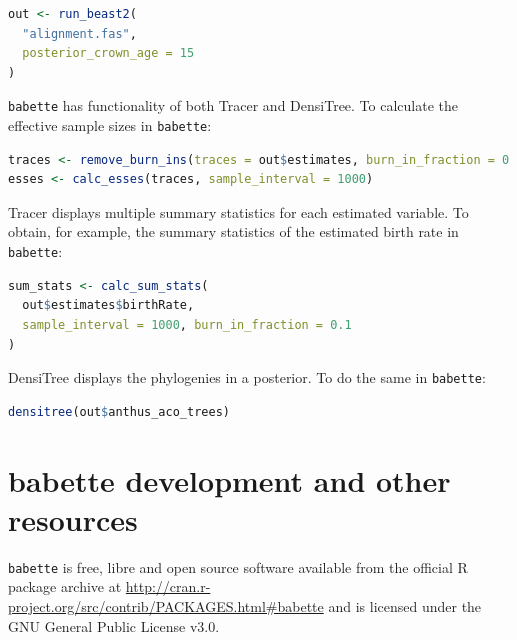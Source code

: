 \documentclass{article}
\begin{document}
\begin{lstlisting}[language=R, caption=Example with fixed crown age, label=lst:fixed_crown_age, floatplacement=H]
out <- run_beast2(
  "alignment.fas",
  posterior_crown_age = 15
)
\end{lstlisting}

\verb;babette; has functionality of both Tracer and
DensiTree. To calculate the effective sample sizes in \verb;babette;:

\begin{lstlisting}[language=R, caption=Calculate ESSes, label=lst:calc_esses, floatplacement=H]
traces <- remove_burn_ins(traces = out$estimates, burn_in_fraction = 0.2)
esses <- calc_esses(traces, sample_interval = 1000)
\end{lstlisting}

Tracer displays multiple summary statistics for each
estimated variable. To obtain, for example, the
summary statistics of the estimated birth rate in \verb;babette;:

\begin{lstlisting}[language=R, caption=Calculate all summary statistics, label=lst:calc_sum_stats, floatplacement=H]
sum_stats <- calc_sum_stats(
  out$estimates$birthRate, 
  sample_interval = 1000, burn_in_fraction = 0.1
)
\end{lstlisting}

DensiTree displays the phylogenies in a posterior.
To do the same in \verb;babette;:

\begin{lstlisting}[language=R, caption=Show posterior phylogenies, label=lst:densitree, floatplacement=H]
densitree(out$anthus_aco_trees)
\end{lstlisting}

\section{babette development and other resources}

\verb;babette; is free, libre and open source software available from the official R package archive at 
\url{http://cran.r-project.org/src/contrib/PACKAGES.html\#babette}
and is licensed under the GNU General Public License v3.0.
\end{document}
